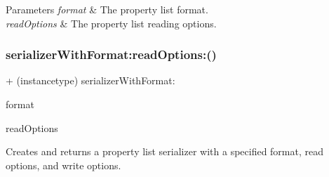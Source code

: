 \begin{DoxyParams}{Parameters}
{\em format} & The property list format. \\
\hline
{\em read\+Options} & The property list reading options. \\
\hline
\end{DoxyParams}
\mbox{\label{interface_a_f_property_list_response_serializer_a8998ba88f9bdae98d24a0e113ff6bbcf}} 
\subsubsection{\texorpdfstring{serializer\+With\+Format\+:read\+Options\+:()}{serializerWithFormat:readOptions:()}\hspace{0.1cm}{\footnotesize\ttfamily [2/3]}}
{\footnotesize\ttfamily + (instancetype) serializer\+With\+Format\+: \begin{DoxyParamCaption}\item[{(N\+S\+Property\+List\+Format)}]{format }\item[{readOptions:(N\+S\+Property\+List\+Read\+Options)}]{read\+Options }\end{DoxyParamCaption}}

Creates and returns a property list serializer with a specified format, read options, and write options.


